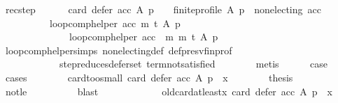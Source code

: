 \begin{isabellebody}
\ rec{\isacharunderscore}{\kern0pt}step{\isacharcolon}{\kern0pt}\isanewline
\ \ \ \ \ \ {\isachardoublequoteopen}{\isacharparenleft}{\kern0pt}card\ {\isacharparenleft}{\kern0pt}defer\ acc\ A\ p{\isacharparenright}{\kern0pt}\ {\isachargreater}{\kern0pt}\ {}\ {\isasymand}\ finite{\isacharunderscore}{\kern0pt}profile\ A\ p\ {\isasymand}\ non{\isacharunderscore}{\kern0pt}electing\ acc{\isacharparenright}{\kern0pt}\ {\isasymlongrightarrow}\isanewline
\ \ \ \ \ \ \ \ \ \ loop{\isacharunderscore}{\kern0pt}comp{\isacharunderscore}{\kern0pt}helper\ acc\ m\ t\ A\ p\ {\isacharequal}{\kern0pt}\isanewline
\ \ \ \ \ \ \ \ \ \ \ \ \ \ loop{\isacharunderscore}{\kern0pt}comp{\isacharunderscore}{\kern0pt}helper\ {\isacharparenleft}{\kern0pt}acc\ {\isasymtriangleright}\ m{\isacharparenright}{\kern0pt}\ m\ t\ A\ p{\isachardoublequoteclose}\ \isanewline
\ \ \ \ \ \ \isamarkupfalse%
\ loop{\isacharunderscore}{\kern0pt}comp{\isacharunderscore}{\kern0pt}helper{\isachardot}{\kern0pt}simps{\isacharparenleft}{\kern0pt}{}{\isacharparenright}{\kern0pt}\ non{\isacharunderscore}{\kern0pt}electing{\isacharunderscore}{\kern0pt}def\ def{\isacharunderscore}{\kern0pt}presv{\isacharunderscore}{\kern0pt}fin{\isacharunderscore}{\kern0pt}prof\isanewline
\ \ \ \ \ \ \ \ \ \ \ \ step{\isacharunderscore}{\kern0pt}reduces{\isacharunderscore}{\kern0pt}defer{\isacharunderscore}{\kern0pt}set\ term{\isacharunderscore}{\kern0pt}not{\isacharunderscore}{\kern0pt}satisfied\isanewline
\ \ \ \ \ \ \isamarkupfalse%
\ metis\isanewline
\ \ \ \ \isamarkupfalse%
\ {\isacharquery}{\kern0pt}case\isanewline
\ \ \ \ \isamarkupfalse%
\ cases\isanewline
\ \ \ \ \ \ \isamarkupfalse%
\ card{\isacharunderscore}{\kern0pt}too{\isacharunderscore}{\kern0pt}small{\isacharcolon}{\kern0pt}\ {\isachardoublequoteopen}card\ {\isacharparenleft}{\kern0pt}defer\ acc\ A\ p{\isacharparenright}{\kern0pt}\ {\isacharless}{\kern0pt}\ x{\isachardoublequoteclose}\isanewline
\ \ \ \ \ \ \isamarkupfalse%
\ {\isacharquery}{\kern0pt}thesis\isanewline
\ \ \ \ \ \ \ \ \isamarkupfalse%
\ not{\isacharunderscore}{\kern0pt}le\isanewline
\ \ \ \ \ \ \ \ \isamarkupfalse%
\ blast\isanewline
\ \ \ \ \isamarkupfalse%
\isanewline
\ \ \ \ \ \ \isamarkupfalse%
\ old{\isacharunderscore}{\kern0pt}card{\isacharunderscore}{\kern0pt}at{\isacharunderscore}{\kern0pt}least{\isacharunderscore}{\kern0pt}x{\isacharcolon}{\kern0pt}\ {\isachardoublequoteopen}{\isasymnot}{\isacharparenleft}{\kern0pt}card\ {\isacharparenleft}{\kern0pt}defer\ acc\ A\ p{\isacharparenright}{\kern0pt}\ {\isacharless}{\kern0pt}\ x{\isacharparenright}{\kern0pt}{\isachardoublequoteclose}\isanewline

\end{isabellebody}
